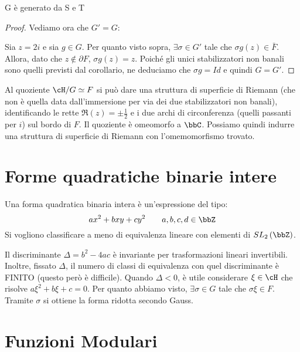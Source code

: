 \begin{teorema}
G è generato da S e T
\end{teorema}


\begin{proof}
Vediamo ora che $G'=G$:

Sia $z=2i$ e sia $g \in G$. Per quanto visto sopra, $\exists \sigma \in G'$
tale che $\sigma g(z) \in \bar{F}$. Allora, dato che $z \notin \partial F$,
$\sigma g(z)=z$.
Poiché gli unici stabilizzatori non banali sono quelli
previsti dal corollario, ne deduciamo che $\sigma g = Id$ e quindi $G=G'$.
\end{proof}

\begin{osservazione}
  Al quoziente $\cH/G \simeq F$ si può dare una struttura di superficie di Riemann
  (che non è quella data dall'immersione per via dei due stabilizzatori non banali),
  identificando le rette $\Re(z)=\pm \frac{1}{2}$ e i due archi di circonferenza
  (quelli passanti per $i$) sul bordo di $F$. Il quoziente è omeomorfo a $\bbC$.
  Possiamo quindi indurre una struttura di superficie di Riemann con l'omemomorfismo trovato.
\end{osservazione}

\section{Forme quadratiche binarie intere}
Una forma quadratica binaria intera è un'espressione del tipo:
$$ ax^2+bxy+cy^2 \qquad a,b,c,d \in \bbZ $$
Si vogliono classificare a meno di equivalenza lineare con elementi di
$SL_2 \left( \bbZ \right)$.

\begin{osservazione}
Il discriminante $\Delta =b^2-4ac$ è invariante per trasformazioni lineari
invertibili. Inoltre, fissato $\Delta$, il numero di classi di equivalenza con
quel discriminante è FINITO (questo però è difficile).
Quando $\Delta < 0$, è utile considerare $\xi \in \cH$ che risolve
$a \xi^2 + b \xi + c =0$. Per quanto abbiamo visto, $\exists \sigma \in G$
tale che $\sigma \xi \in F$. Tramite $\sigma$ si ottiene la forma ridotta secondo
Gauss.
\end{osservazione}

\section{Funzioni Modulari}

